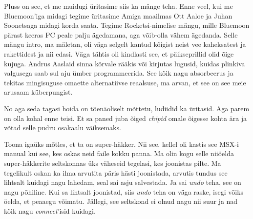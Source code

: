 Pluss on see, et me muidugi üritasime  siis ka mänge teha. Enne veel, kui me Bluemoon'iga  midagi tegime üritasime Amiga maailmas  Ott Aaloe ja Juhan Soonetsaga midagi korda saata. Tegime Rocketsi-nimelise mängu, mille Bluemoon pärast keeras PC peale palju ägedamana, aga võib-olla vähem ägedanda. Selle mängu intro, ma mäletan, oli väga selgelt kantud kõigist neist vee kaheksatest ja rakettidest ja nii edasi. Väga tähtis oli kindlasti see, et päikseprillid olid õige kujuga. Andrus Aaslaid sinna kõrvale rääkis või kirjutas lugusid, kuidas plinkiva valgusega saab sul aju ümber programmeerida. See kõik nagu absorbeerus ja tekitas mingisuguse omaette alternatiivse reaalsuse, ma arvan, et see on see meie arusaam küberpungist. 


No aga seda tagasi hoida on tõenäoliselt mõttetu, ludiidid ka üritasid. Aga parem on olla kohal enne teisi. Et sa paned juba õiged \emph{chipid} omale õigesse kohta  ära ja võtad selle pudru osakaalu väiksemaks. 


Toona igaüks mõtles, et ta on super-häkker. Nii see, kellel oli kastis see MSX-i manual kui see, kes oskas neid faile kokku panna. Ma olin kogu selle niiöelda super-häkkerite seltskonnas üks väheseid tegelasi, kes joonistas pilte. Ma  tegelikult oskan ka ilma arvutita päris hästi joonistada, arvutis tundus see lihtsalt  kuidagi nagu lahedam, seal sai asju salvestada. Ja sai \emph{undo} teha, see on nagu põhiline. Kui sa lihtsalt joonistad, siis \emph{undo} teha on väga raske, isegi võiks öelda, et peaaegu võimatu. Jällegi, see seltskond ei olnud nagu nii suur ja nad kõik nagu \emph{connect}'isid kuidagi. 


